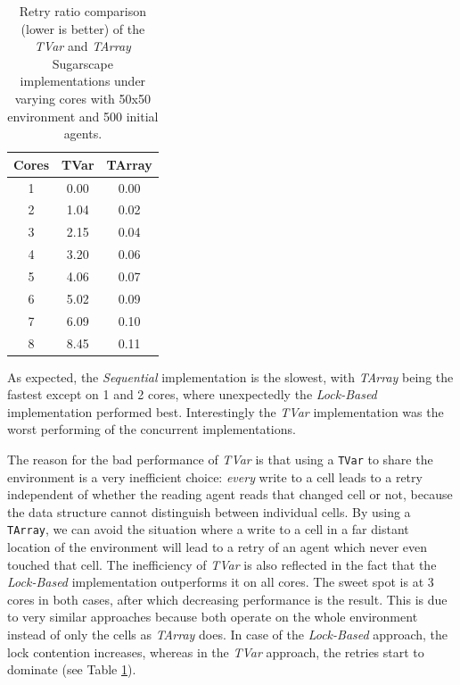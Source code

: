 \begin{table}
	\centering
  	\begin{tabular}{ c || c | c }
        Cores & TVar  & TArray  \\ \hline \hline 
    		1     & 0.00  & 0.00    \\ \hline
   		2     & 1.04  & 0.02    \\ \hline
   		3     & 2.15  & 0.04    \\ \hline
   		4     & 3.20  & 0.06    \\ \hline
   		5     & 4.06  & 0.07    \\ \hline
   		6     & 5.02  & 0.09    \\ \hline
   		7     & 6.09  & 0.10    \\ \hline
   		8     & 8.45  & 0.11    \\ \hline \hline
   	\end{tabular}
 
  	\caption{Retry ratio comparison (lower is better) of the \textit{TVar} and \textit{TArray} Sugarscape implementations under varying cores with 50x50 environment and 500 initial agents.}
	\label{tab:sugarscape_retry_ratios}
\end{table}

As expected, the \textit{Sequential} implementation is the slowest, with \textit{TArray} being the fastest except on 1 and 2 cores, where unexpectedly the \textit{Lock-Based} implementation performed best. Interestingly the \textit{TVar} implementation was the worst performing of the concurrent implementations.

The reason for the bad performance of \textit{TVar} is that using a \texttt{TVar} to share the environment is a very inefficient choice: \textit{every} write to a cell leads to a retry independent of whether the reading agent reads that changed cell or not, because the data structure cannot distinguish between individual cells. By using a \texttt{TArray}, we can avoid the situation where a write to a cell in a far distant location of the environment will lead to a retry of an agent which never even touched that cell. The inefficiency of \textit{TVar} is also reflected in the fact that the \textit{Lock-Based} implementation outperforms it on all cores. The sweet spot is at 3 cores in both cases, after which decreasing performance is the result. This is due to very similar approaches because both operate on the whole environment instead of only the cells as \textit{TArray} does. In case of the \textit{Lock-Based} approach, the lock contention increases, whereas in the \textit{TVar} approach, the retries start to dominate (see Table \ref{tab:sugarscape_retry_ratios}).


